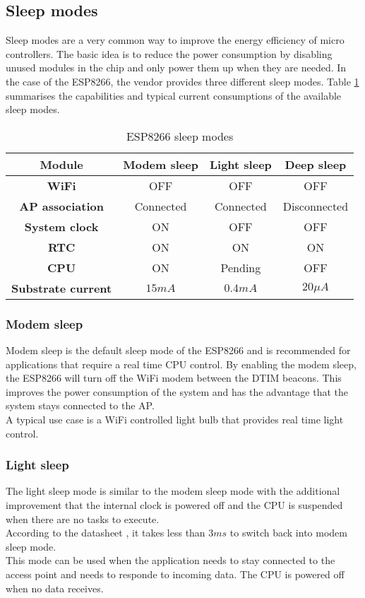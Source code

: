 \subsection{Sleep modes}
Sleep modes are a very common way to improve the energy efficiency of micro controllers.
The basic idea is to reduce the power consumption by disabling unused modules in the chip and only power them up when they are needed.
In the case of the ESP8266, the vendor provides three different sleep modes. 
Table \ref{tab_sleep_modes} summarises the capabilities and typical current consumptions of the available sleep modes.
\cite{mesquita_assessing_2018}

\begin{table}[htbp]
\caption{ESP8266 sleep modes}
\begin{center}
\begin{tabular}{|c|c|c|c|}
\hline
\textbf{Module}&\textbf{Modem sleep}&\textbf{Light sleep}&\textbf{Deep sleep}\\
\hline
\textbf{WiFi} & OFF & OFF & OFF\\
\textbf{AP association} & Connected & Connected & Disconnected\\
\textbf{System clock} & ON & OFF & OFF\\
\textbf{RTC} & ON & ON & ON\\
\textbf{CPU} & ON & Pending & OFF\\
\hline
\textbf{Substrate current} & $15mA$ & $0.4mA$ & $20\mu A$\\
\hline
\end{tabular}
\label{tab_sleep_modes}
\end{center}
\end{table}

\subsubsection{Modem sleep}
Modem sleep is the default sleep mode of the ESP8266 and is recommended for applications that require a real time CPU control. \cite{mesquita_assessing_2018}
By enabling the modem sleep, the ESP8266 will turn off the WiFi modem between the DTIM beacons. 
This improves the power consumption of the system and has the advantage that the system stays connected to the AP.\\
A typical use case is a WiFi controlled light bulb that provides real time light control.\cite{espressif_inc_esp8266_2016}

\subsubsection{Light sleep}
The light sleep mode is similar to the modem sleep mode with the additional improvement that the internal clock is powered off and the CPU is suspended when there are no tasks to execute.\\
According to the datasheet \cite{espressif_inc_esp8266_2016}, it takes less than $3ms$ to switch back into modem sleep mode.\\
This mode can be used when the application needs to stay connected to the access point 
and needs to responde to incoming data. The CPU is powered off when no data receives.

